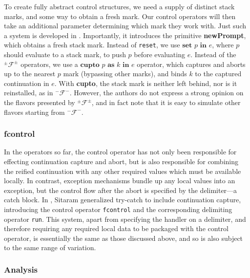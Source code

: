 \documentclass[11pt]{article}
\newcommand{\maybePage}{\null}
\newcommand\F{\mathcal{F}}
\newcommand\pmFpm{^\pm\F^\pm}
\begin{document}
To create fully abstract control structures, we need a supply of distinct stack marks, and some way to obtain a fresh mark.
Our control operators will then take an additional parameter determining which mark they work with.
Just such a system is developed in \cite{Gunter:1995}.
Importantly, it introduces the primitive \textbf{newPrompt}, which obtains a fresh stack mark.
Instead of \texttt{reset}, we use $\textbf{set }p\textbf{ in }e$, where $p$ should evaluate to a stack mark, to push $p$ before evaluating $e$.
Instead of the $\pmFpm$ operators, we use a $\textbf{cupto }p\textbf{ as }k\textbf{ in }e$ operator, which captures and aborts up to the nearest $p$ mark (bypassing other marks), and binds $k$ to the captured continuation in $e$.
With \textbf{cupto}, the stack mark is neither left behind, nor is it reinstalled, as in $^-\mathcal{F}^-$.
However, the authors do not express a strong opinion on the flavors presented by $\pmFpm$, and in fact note that it is easy to simulate other flavors starting from $^-\mathcal{F}^-$.

\maybePage
\subsubsection{fcontrol}

In the operators so far, the control operator has not only been responsible for effecting continuation capture and abort, but is also responsible for combining the reified continuation with any other required values which must be available locally.
In contrast, exception mechanisms bundle up any local values into an exception, but the control flow after the abort is specified by the delimiter---a catch block.
In \cite{HandlingControl}, Sitaram generalized try-catch to include continuation capture, introducing the control operator \texttt{fcontrol} and the corresponding delimiting operator \texttt{run}.
This system, apart from specifying the handler on a delimiter, and therefore requiring any required local data to be packaged with the control operator, is essentially the same as those discussed above, and so is also subject to the same range of variation.

\maybePage
\subsubsection{Analysis}
\label{subsubsec:delimControlAnalysis}
\end{document}
